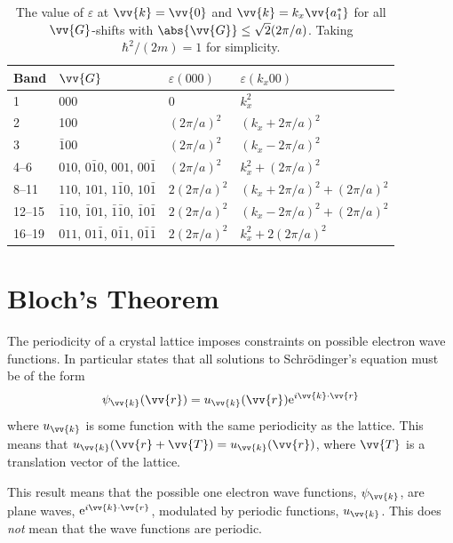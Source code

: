 \documentclass[fleqn]{NotesClass}
\newcommand*{\e}{\mathrm{e}}
\begin{document}
    \begin{table}
        \caption{The value of \(\varepsilon\) at \(\vv{k} = \vv{0}\) and \(\vv{k} = k_x\vv{a_1^*}\) for all \(\vv{G}\)-shifts with \(\abs{\vv{G}} \le \sqrt{2}(2\pi/a)\). Taking \(\hbar^2/(2m) = 1\) for simplicity.}
        \label{tab:G-shifted paraboloids}
        \begin{tabular}{llll}\toprule
            Band & \(\vv{G}\) & \(\varepsilon(000)\) & \(\varepsilon(k_x00)\)\\\midrule
            1 & 000 & 0 & \(k_x^2\)\\
            2 & 100 & \((2\pi/a)^2\) & \((k_x + 2\pi/a)^2\)\\
            3 & \(\bar{1}00\) & \((2\pi/a)^2\) & \((k_x - 2\pi/a)^2\)\\
            4--6 & \(010\), \(0\bar{1}0\), \(001\), \(00\bar{1}\) & \((2\pi/a)^2\) & \(k_x^2 + (2\pi/a)^2\)\\
            8--11 & \(110\), \(101\), \(1\bar{1}0\), \(10\bar{1}\) & \(2(2\pi/a)^2\) & \((k_x + 2\pi/a)^2 + (2\pi/a)^2\)\\
            12--15 & \(\bar{1}10\), \(\bar{1}01\), \(\bar{1}\bar{1}0\), \(\bar{1}0\bar{1}\) & \(2(2\pi/a)^2\) & \((k_x - 2\pi/a)^2 + (2\pi/a)^2\)\\
            16--19 & \(011\), \(01\bar{1}\), \(0\bar{1}1\), \(0\bar{1}\bar{1}\) & \(2(2\pi/a)^2\) & \(k_x^2 + 2(2\pi/a)^2\)\\\bottomrule
        \end{tabular}
    \end{table}
    
    \section{Bloch's Theorem}
    The periodicity of a crystal lattice imposes constraints on possible electron wave functions.
    In particular  states that all solutions to Schr\"odinger's equation must be of the form
    \begin{equation}
        \psi_{\vv{k}}(\vv{r}) = u_{\vv{k}}(\vv{r})\e^{i\vv{k}\cdot\vv{r}}
    \end{equation}
    where \(u_{\vv{k}}\) is some function with the same periodicity as the lattice.
    This means that \(u_{\vv{k}}(\vv{r} + \vv{T}) = u_{\vv{k}}(\vv{r})\), where \(\vv{T}\) is a translation vector of the lattice.
    
    This result means that the possible one electron wave functions, \(\psi_{\vv{k}}\), are plane waves, \(\e^{i\vv{k}\cdot\vv{r}}\), modulated by periodic functions, \(u_{\vv{k}}\).
    This does \emph{not} mean that the wave functions are periodic.
    
\end{document}
